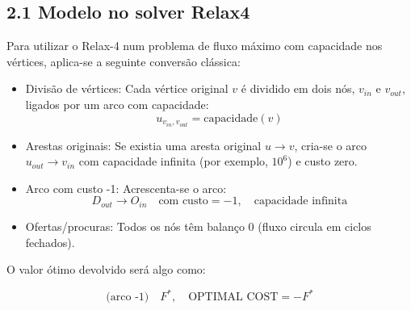 \documentclass[a4paper,12pt]{article}
\begin{document}
\subsection*{2.1 Modelo no solver Relax4}
Para utilizar o Relax-4 num problema de fluxo máximo com capacidade nos vértices, aplica-se a seguinte conversão clássica:

\begin{itemize}
    \item Divisão de vértices: Cada vértice original $v$ é dividido em dois nós, $v_{in}$ e $v_{out}$, ligados por um arco com capacidade:
    \begin{equation*}
        u_{v_{in}, v_{out}} = \text{capacidade}(v)
    \end{equation*}

    \item Arestas originais: Se existia uma aresta original $u \rightarrow v$, cria-se o arco $u_{out} \rightarrow v_{in}$ com capacidade infinita (por exemplo, $10^6$) e custo zero.

    \item Arco com custo -1: Acrescenta-se o arco:
    \begin{equation*}
         D_{out} \rightarrow O_{in} \quad \text{com custo} = -1, \quad \text{capacidade infinita}
    \end{equation*}

    \item Ofertas/procuras: Todos os nós têm balanço 0 (fluxo circula em ciclos fechados).
\end{itemize}

O valor ótimo devolvido será algo como:

\begin{equation*}
    \text{(arco -1)} \quad F^*, \quad \text{OPTIMAL COST} = -F^*
\end{equation*}

\vspace{0.5em}
\end{document}
